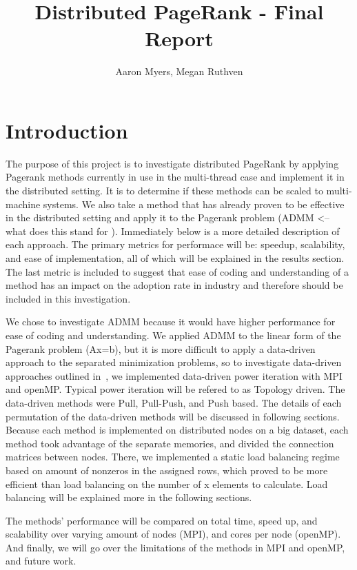 \documentclass[letterpaper,12pt,onecolumn]{article}
\title{Distributed PageRank - Final Report}
\author{Aaron Myers, Megan Ruthven}
\begin{document}
\maketitle
\tableofcontents
\pagebreak
\section{Introduction}
The purpose of this project is to investigate distributed PageRank by applying Pagerank methods currently in use in the multi-thread case and implement it in the distributed setting. It is to determine if these methods can be scaled to multi-machine systems. We also take a method that has already proven to be effective in the distributed setting and apply it to the Pagerank problem (ADMM <-- what does this stand for \cite{ADMM}). Immediately below is a more detailed description of each approach. The primary metrics for performace will be: speedup, scalability, and ease of implementation, all of which will be explained in the results section. The last metric is included to suggest that ease of coding and understanding of a method has an impact on the adoption rate in industry and therefore should be included in this investigation.

We chose to investigate ADMM \cite{ADMM} because it would have higher performance for ease of coding and understanding. We applied ADMM to the linear form of the Pagerank problem (Ax=b), but it is more difficult to apply a data-driven approach to the separated minimization problems, so to investigate data-driven approaches outlined in~\cite{Joyce}, we implemented data-driven power iteration with MPI and openMP. Typical power iteration will be refered to as Topology driven. The data-driven methods were Pull, Pull-Push, and Push based. The details of each permutation of the data-driven methods will be discussed in following sections. Because each method is implemented on distributed nodes on a big dataset, each method took advantage of the separate memories, and divided the connection matrices between nodes. There, we implemented a static load balancing regime based on amount of nonzeros in the assigned rows, which proved to be more efficient than load balancing on the number of x elements to calculate. Load balancing will be explained more in the following sections. 

The methods' performance will be compared on total time, speed up, and scalability over varying amount of nodes (MPI), and cores per node (openMP). And finally, we will go over the limitations of the methods in MPI and openMP, and future work. 
\end{document}
